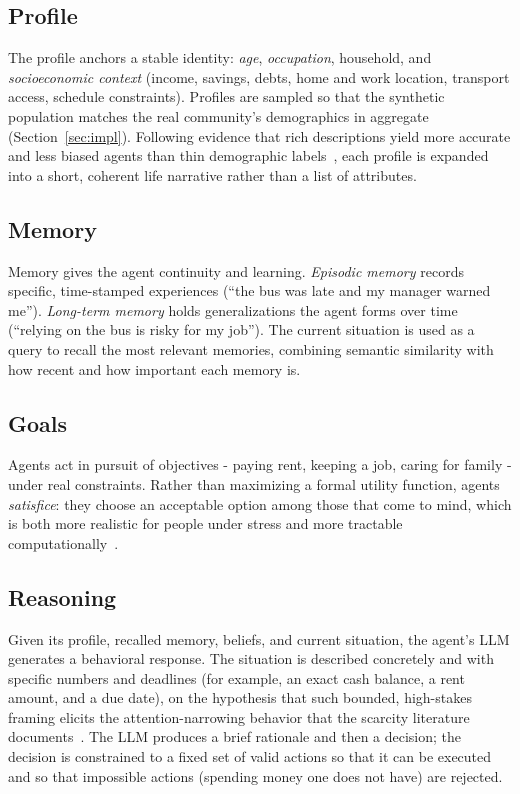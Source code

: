 \documentclass[conference]{IEEEtran}
\begin{document}
\subsection{Profile}
The profile anchors a stable identity: \emph{age}, \emph{occupation}, household, and \emph{socioeconomic context} (income, savings, debts, home and work location, transport access, schedule constraints). Profiles are sampled so that the synthetic population matches the real community's demographics in aggregate (Section~\ref{sec:impl}). Following evidence that rich descriptions yield more accurate and less biased agents than thin demographic labels~\cite{park2024}, each profile is expanded into a short, coherent life narrative rather than a list of attributes.

\subsection{Memory}
Memory gives the agent continuity and learning. \emph{Episodic memory} records specific, time-stamped experiences (``the bus was late and my manager warned me''). \emph{Long-term memory} holds generalizations the agent forms over time (``relying on the bus is risky for my job''). The current situation is used as a query to recall the most relevant memories, combining semantic similarity with how recent and how important each memory is.

\subsection{Goals}
Agents act in pursuit of objectives - paying rent, keeping a job, caring for family - under real constraints. Rather than maximizing a formal utility function, agents \emph{satisfice}: they choose an acceptable option among those that come to mind, which is both more realistic for people under stress and more tractable computationally~\cite{simon1955,mullainathan2013}.

\subsection{Reasoning}
Given its profile, recalled memory, beliefs, and current situation, the agent's LLM generates a behavioral response. The situation is described concretely and with specific numbers and deadlines (for example, an exact cash balance, a rent amount, and a due date), on the hypothesis that such bounded, high-stakes framing elicits the attention-narrowing behavior that the scarcity literature documents~\cite{mullainathan2013}. The LLM produces a brief rationale and then a decision; the decision is constrained to a fixed set of valid actions so that it can be executed and so that impossible actions (spending money one does not have) are rejected.
\end{document}
